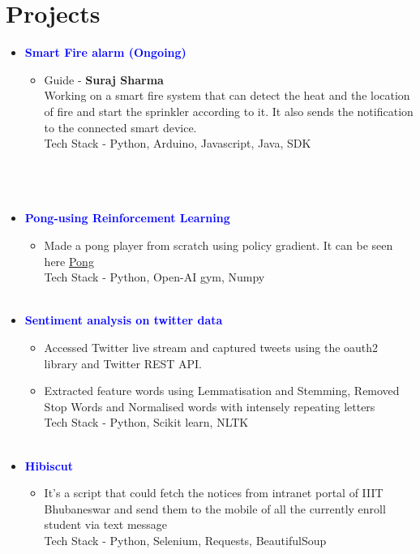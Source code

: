 \documentclass[11pt,a4paper,roman]{moderncv}
\begin{document}
    \section{Projects}
    \vspace{6pt}
    \begin{itemize}
    \item \textcolor{blue}{\textbf{Smart Fire alarm (Ongoing)}}
        \begin{itemize}
        \item Guide - \textbf{Suraj   Sharma} \\
        Working on a smart fire system that can detect the heat and the location of fire and start the sprinkler according to it. It also sends the notification to the connected smart device.\\Tech Stack - Python, Arduino, Javascript, Java, SDK\\ \\ \\ \\
        \end{itemize}
    \item \textcolor{blue}{\textbf{Pong-using Reinforcement Learning}}
        \begin{itemize}
        \item Made a pong player from scratch using policy gradient. It can be seen here \href{https://github.com/AbhiRepository/RL}{Pong} \\Tech Stack - Python, Open-AI gym, Numpy\\ \\ 
        \end{itemize}
    \item \textcolor{blue}{\textbf{Sentiment analysis on twitter data}}
        \begin{itemize}
        \item  Accessed Twitter live stream and captured tweets using the oauth2 library and Twitter REST API.
        \item Extracted feature words using Lemmatisation and Stemming, Removed Stop Words and Normalised words with intensely repeating letters\\Tech Stack - Python, Scikit learn, NLTK\\ \\
        \end{itemize}
    \item \textcolor{blue}{\textbf{Hibiscut}}
        \begin{itemize}
        \item  It's a script that could fetch the notices from intranet portal of IIIT Bhubaneswar and send them to the mobile of all the currently enroll student via text message\\Tech Stack - Python, Selenium, Requests, BeautifulSoup
        \end{itemize}
    \end{itemize}
\end{document}
